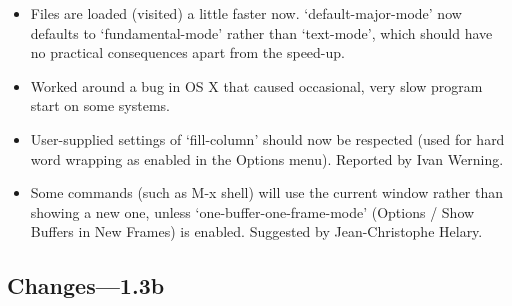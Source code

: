 \begin{itemize}
\item Files are loaded (visited) a little faster now.  `default-major-mode' now defaults to `fundamental-mode' rather than `text-mode', which should have no practical consequences apart from the speed-up.

\item Worked around a bug in OS X that caused occasional, very slow program start on some systems.

\item User-supplied settings of `fill-column' should now be   respected (used for hard word wrapping as enabled in the   Options menu). Reported by Ivan Werning.

\item Some commands (such as M-x shell) will use the current window rather than showing a new one, unless `one-buffer-one-frame-mode' (Options / Show Buffers in New Frames) is enabled.  Suggested by Jean-Christophe Helary.

\end{itemize}

\subsection{Changes---1.3b}

